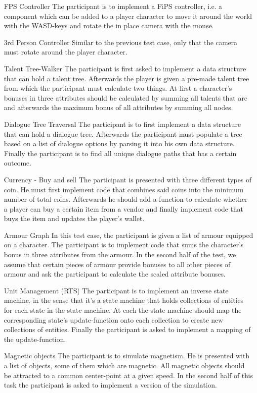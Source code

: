 \begin{labeling}{\quad\quad}
    \item[FPS Controller] The participant is to implement a \gls{FiPS} controller, i.e. a component which can be added to a player character to move it around the world with the WASD-keys and rotate the in place camera with the mouse.
    \item[3rd Person Controller] Similar to the previous test case, only that the camera must rotate around the player character.
    \item[Talent Tree-Walker] The participant is first asked to implement a data structure that can hold a talent tree. Afterwards the player is given a pre-made talent tree from which the participant must calculate two things. At first a character's bonuses in three attributes should be calculated by summing all talents that are  and afterwards the maximum bonus of all attributes by summing all nodes.
    \item[Dialogue Tree Traversal] The participant is to first implement a data structure that can hold a dialogue tree. Afterwards the participant must populate a tree based on a list of dialogue options by parsing it into his own data structure. Finally the participant is to find all unique dialogue paths that has a certain outcome. 
    \item[Currency - Buy and sell] The participant is presented with three different types of coin. He must first implement code that combines said coins into the minimum number of total coins. Afterwards he should add a function to calculate whether a player can buy a certain item from a vendor and finally implement code that buys the item and updates the player's wallet. 
    \item[Armour Graph] In this test case, the participant is given a list of armour equipped on a character. The participant is to implement code that sums the character's bonus in three attributes from the armour. In the second half of the test, we assume that certain pieces of armour provide bonuses to all other pieces of armour and ask the participant to calculate the scaled attribute bonuses.
    \item[Unit Management (RTS)] The participant is to implement an inverse state machine, in the sense that it's a state machine that holds collections of entities for each state in the state machine. At each  the state machine should map the corresponding state's update-function onto each collection to create new collections of entities. Finally the participant is asked to implement a  mapping of the update-function.
    \item[Magnetic objects] The participant is to simulate magnetism. He is presented with a list of objects, some of them which are magnetic. All magnetic objects should be attracted to a common center-point at a given speed. In the second half of this task the participant is asked to implement a  version of the simulation.
\end{labeling}

